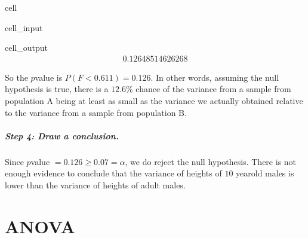 \documentclass[letterpaper,10pt,english]{jupyterBook}
\begin{document}
\begin{sphinxuseclass}{cell}\begin{sphinxVerbatimInput}

\begin{sphinxuseclass}{cell_input}
\begin{sphinxVerbatim}[commandchars=\\\{\}]
\end{sphinxVerbatim}

\end{sphinxuseclass}\end{sphinxVerbatimInput}
\begin{sphinxVerbatimOutput}

\begin{sphinxuseclass}{cell_output}\begin{equation*}
\begin{split}0.12648514626268\end{split}
\end{equation*}
\end{sphinxuseclass}\end{sphinxVerbatimOutput}

\end{sphinxuseclass}
\sphinxAtStartPar
So the \(p\)\sphinxhyphen{}value is \(P(F < 0.611) = 0.126\). In other words, assuming the null hypothesis is true, there is a \(12.6\%\) chance of the variance from a sample from population A being at least as small as the variance we actually obtained relative to the variance from a sample from population B.


\subparagraph{Step 4: Draw a conclusion.}
\label{\detokenize{Ch9 Hypothesis Tests of Two or More Populations/9.2 Hypothesis Testing Two Population Variances:step-4-draw-a-conclusion}}
\sphinxAtStartPar
Since \(p\)\sphinxhyphen{}value \(= 0.126 \geq 0.07 = \alpha\), we do  reject the null hypothesis. There is not enough evidence to conclude that the variance of heights of \(10\) year\sphinxhyphen{}old males is lower than the variance of heights of adult males.

\sphinxstepscope


\section{ANOVA}
\label{\detokenize{Ch9 Hypothesis Tests of Two or More Populations/9.3 ANOVA:anova}}\label{\detokenize{Ch9 Hypothesis Tests of Two or More Populations/9.3 ANOVA::doc}}
\end{document}
